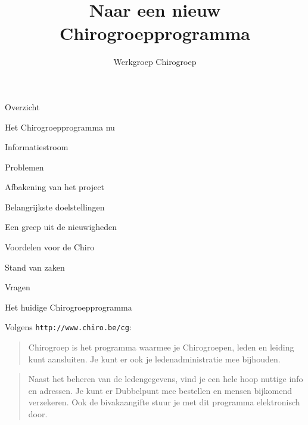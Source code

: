 \documentclass[chiro,pdf]{prosper}
\title{Naar een nieuw Chirogroepprogramma}
\author{Werkgroep Chirogroep}
\begin{document}
\maketitle

%
%

{
\begin{slide}{Overzicht}

\begin{itemstep}
\item Het Chirogroepprogramma nu
\item Informatiestroom
\item Problemen
\item Afbakening van het project
\item Belangrijkste doelstellingen
\item Een greep uit de nieuwigheden
\item Voordelen voor de Chiro
\item Stand van zaken
\item Vragen
\end{itemstep}

\end{slide}
}

%
%

{
\begin{slide}{Het huidige Chirogroepprogramma}

Volgens \texttt{http://www.chiro.be/cg}:

{
\begin{quotation}
Chirogroep is het programma waarmee je Chirogroepen, leden en leiding kunt aansluiten.
Je kunt er ook je ledenadministratie mee bijhouden.
\end{quotation}
}

{
\begin{quotation}
Naast het beheren van de ledengegevens, vind je een hele hoop nuttige info en adressen. Je kunt er Dubbelpunt mee bestellen en mensen bijkomend verzekeren. Ook de bivakaangifte stuur je met dit programma elektronisch door.
\end{quotation}
}

\end{slide}
}

%
%
\end{document}
